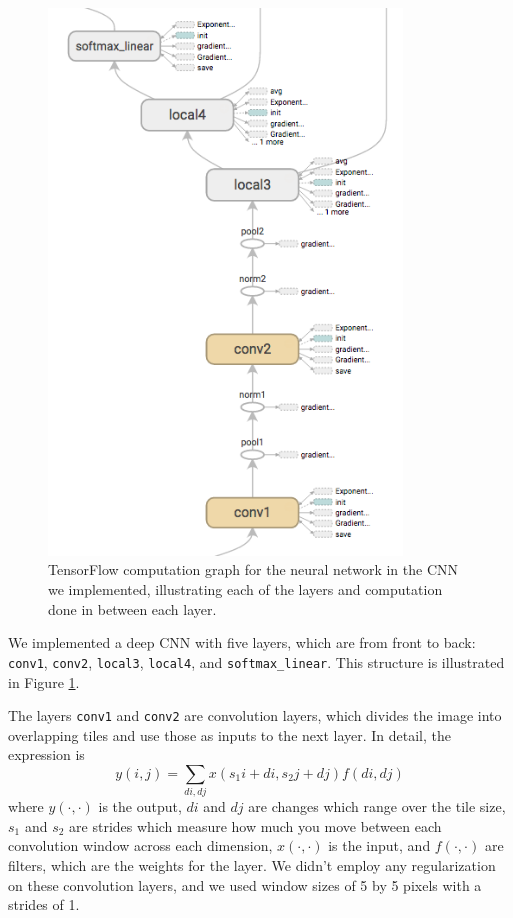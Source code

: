\documentclass[11pt, twocolumn, twoside]{article}
\begin{document}
\begin{figure}
	\centering
	\includegraphics[width=3.7in]{inference_graph}
	\caption{TensorFlow computation graph for the neural network in the CNN we implemented, illustrating each of the layers and computation done in between each layer.}
	\label{fig:inference}
\end{figure}

We implemented a deep CNN with five layers, which are from front to back: \texttt{conv1}, \texttt{conv2}, \texttt{local3}, \texttt{local4}, and \texttt{softmax\_linear}. This structure is illustrated in Figure \ref{fig:inference}. 

The layers \texttt{conv1} and \texttt{conv2} are convolution layers, which divides the image into overlapping tiles and use those as inputs to the next layer. In detail, the expression is
\[ y(i, j) = \sum_{di, dj} x(s_1i + di, s_2j + dj) f(di, dj)\]
where $y(\cdot, \cdot)$ is the output, $di$ and $dj$ are changes which range over the tile size, $s_1$ and $s_2$ are strides which measure how much you move between each convolution window across each dimension, $x(\cdot, \cdot)$ is the input, and $f(\cdot, \cdot)$ are filters, which are the weights for the layer. We didn't employ any regularization on these convolution layers, and we used window sizes of 5 by 5 pixels with a strides of 1.
\end{document}

